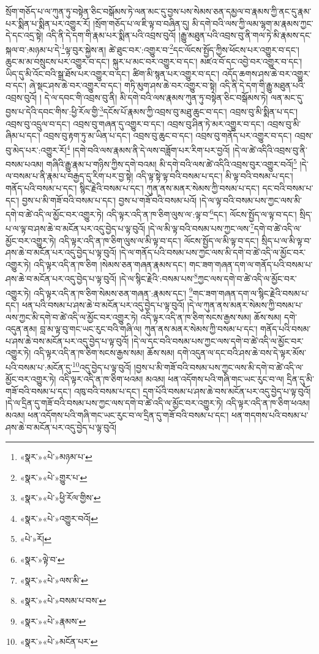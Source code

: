 སྲོག་གཅོད་པ་ལ་ཀུན་ཏུ་བསྟེན་ཅིང་བསྒོམས་ཏེ་ལན་མང་དུ་བྱས་པས་སེམས་ཅན་དམྱལ་བ་རྣམས་ཀྱི་ནང་དུ་རྣམ་པར་སྨིན་པ་སྨིན་པར་འགྱུར་རོ། །སྲོག་གཅོད་པ་ལ་ཇི་ལྟ་བ་བཞིན་དུ། མི་དགེ་བའི་ལས་ཀྱི་ལམ་ལྷག་མ་རྣམས་ཀྱང་དེ་དང་འདྲ་སྟེ། འདི་ནི་དེ་དག་གི་རྣམ་པར་སྨིན་པའི་འབྲས་བུའོ། །རྒྱུ་མཐུན་པའི་འབྲས་བུ་ནི་གལ་ཏེ་མི་རྣམས་དང་སྐལ་བ་:མཉམ་པ་དེ་\footnote{«སྣར་»«པེ་»མཉམ་པ་}ལྟ་བུར་སྐྱེས་ན། ཚེ་ཐུང་བར་:འགྱུར་བ་\footnote{«སྣར་»«པེ་»གྱུར་པ་}དང་ལོངས་སྤྱོད་ཀྱིས་ཕོངས་པར་འགྱུར་བ་དང་། ཆུང་མ་མ་བསྲུངས་པར་འགྱུར་བ་དང་། སྐུར་པ་མང་བར་འགྱུར་བ་དང་། མཛའ་བོ་དང་འབྱེ་བར་འགྱུར་བ་དང་། ཡིད་དུ་མི་འོང་བའི་སྒྲ་ཐོས་པར་འགྱུར་བ་དང་། ཚིག་མི་སྙན་པར་འགྱུར་བ་དང་། འདོད་ཆགས་ཤས་ཆེ་བར་འགྱུར་བ་དང་། ཞེ་སྡང་ཤས་ཆེ་བར་འགྱུར་བ་དང་། གཏི་མུག་ཤས་ཆེ་བར་འགྱུར་བ་སྟེ། འདི་ནི་དེ་དག་གི་རྒྱུ་མཐུན་པའི་འབྲས་བུའོ། །
དེ་ལ་དབང་གི་འབྲས་བུ་ནི། མི་དགེ་བའི་ལས་རྣམས་ཀུན་ཏུ་བསྟེན་ཅིང་བསྒོམས་ཏེ། ལན་མང་དུ་བྱས་པ་དེའི་དབང་གིས་:ཕྱི་རོལ་གྱི་\footnote{«སྣར་»«པེ་»ཕྱི་རོལ་གྱིས་}དངོས་པོ་རྣམས་ཀྱི་འབྲས་བུ་མཐུ་ཆུང་བ་དང་། འབྲས་བུ་མི་སྨིན་པ་དང་། འབྲས་བུ་འདྲུལ་བ་དང་། འབྲས་བུ་གཞན་དུ་འགྱུར་བ་དང་། འབྲས་བུ་ཤིན་ཏེ་མར་འགྱུར་བ་དང་། འབྲས་བུ་མི་ཞིམ་པ་དང་། འབྲས་བུ་རྟག་ཏུ་མ་ཡིན་པ་དང་། འབྲས་བུ་ཆུང་བ་དང་། འབྲས་བུ་གནོད་པར་འགྱུར་བ་དང་། འབྲས་བུ་མེད་པར་:འགྱུར་རོ།\footnote{«སྣར་»«པེ་»འགྱུར་བའོ།} །དགེ་བའི་ལས་རྣམས་ནི་དེ་ལས་བཟློག་པར་རིག་པར་བྱའོ། །དེ་ལ་ཚེ་འདིའི་འབྲས་བུ་ནི་བསམ་པའམ། གཞིའི་རྒྱུ་རྣམ་པ་གཉིས་ཀྱིས་དགེ་བའམ། མི་དགེ་བའི་ལས་ཚེ་འདིའི་འབྲས་བུར་འགྱུར་བའོ།\footnote{«པེ་»རོ།} །དེ་ལ་བསམ་པ་ནི་རྣམ་པ་བརྒྱད་དུ་རིག་པར་བྱ་སྟེ། འདི་ལྟ་སྟེ་ལྟ་བའི་བསམ་པ་དང་། མི་ལྟ་བའི་བསམ་པ་དང་། གནོད་པའི་བསམ་པ་དང་། སྙིང་རྗེའི་བསམ་པ་དང་། ཀུན་ནས་མནར་སེམས་ཀྱི་བསམ་པ་དང་། དང་བའི་བསམ་པ་དང་། བྱས་པ་མི་གཟོ་བའི་བསམ་པ་དང་། བྱས་པ་གཟོ་བའི་བསམ་པའོ། །དེ་ལ་ལྟ་བའི་བསམ་པས་ཀྱང་ལས་མི་དགེ་བ་ཚེ་འདི་ལ་མྱོང་བར་འགྱུར་ཏེ། འདི་ལྟར་འདི་ན་ཁ་ཅིག་ལུས་ལ་:ལྟ་བ་\footnote{«སྣར་»ལྟེ་བ་}དང་། ལོངས་སྤྱོད་ལ་ལྟ་བ་དང་། སྲིད་པ་ལ་ལྟ་བ་ཤས་ཆེ་བ་མངོན་པར་འདུ་བྱེད་པ་ལྟ་བུའོ། །དེ་ལ་མི་ལྟ་བའི་བསམ་པས་ཀྱང་ལས་\footnote{«སྣར་»«པེ་»ལས་མི་}དགེ་བ་ཚེ་འདི་ལ་མྱོང་བར་འགྱུར་ཏེ། འདི་ལྟར་འདི་ན་ཁ་ཅིག་ལུས་ལ་མི་ལྟ་བ་དང་། ལོངས་སྤྱོད་ལ་མི་ལྟ་བ་དང་། སྲིད་པ་ལ་མི་ལྟ་བ་ཤས་ཆེ་བ་མངོན་པར་འདུ་བྱེད་པ་ལྟ་བུའོ། །དེ་ལ་གནོད་པའི་བསམ་པས་ཀྱང་ལས་མི་དགེ་བ་ཚེ་འདི་ལ་མྱོང་བར་འགྱུར་ཏེ། འདི་ལྟར་འདི་ན་ཁ་ཅིག །སེམས་ཅན་གཞན་རྣམས་དང་། གང་ཟག་གཞན་དག་ལ་གནོད་པའི་བསམ་པ་ཤས་ཆེ་བ་མངོན་པར་འདུ་བྱེད་པ་ལྟ་བུའོ། །དེ་ལ་སྙིང་རྗེའི་:བསམ་པས་\footnote{«སྣར་»«པེ་»བསམ་པ་བས་}ཀྱང་ལས་དགེ་བ་ཚེ་འདི་ལ་མྱོང་བར་འགྱུར་ཏེ། འདི་ལྟར་འདི་ན་ཁ་ཅིག་སེམས་ཅན་གཞན་:རྣམས་དང་། \footnote{«སྣར་»«པེ་»རྣམས་}གང་ཟག་གཞན་དག་ལ་སྙིང་རྗེའི་བསམ་པ་དང་། ཕན་པའི་བསམ་པ་ཤས་ཆེ་བ་མངོན་པར་འདུ་བྱེད་པ་ལྟ་བུའོ། །དེ་ལ་ཀུན་ནས་མནར་སེམས་ཀྱི་བསམ་པ་ལས་ཀྱང་མི་དགེ་བ་ཚེ་འདི་ལ་མྱོང་བར་འགྱུར་ཏེ། འདི་ལྟར་འདི་ན་ཁ་ཅིག་སངས་རྒྱས་སམ། ཆོས་སམ། དགེ་འདུན་ནམ། བླ་མ་ལྟ་བུ་གང་ཡང་རུང་བའི་གཞི་ལ། ཀུན་ནས་མནར་སེམས་ཀྱི་བསམ་པ་དང་། གནོད་པའི་བསམ་པ་ཤས་ཆེ་བས་མངོན་པར་འདུ་བྱེད་པ་ལྟ་བུའོ། །དེ་ལ་དང་བའི་བསམ་པས་ཀྱང་ལས་དགེ་བ་ཚེ་འདི་ལ་མྱོང་བར་འགྱུར་ཏེ། འདི་ལྟར་འདི་ན་ཁ་ཅིག་སངས་རྒྱས་སམ། ཆོས་སམ། དགེ་འདུན་ལ་དང་བའི་ཤས་ཆེ་བས་དེ་ལྟར་མོས་པའི་བསམ་པ་:མངོན་དུ་\footnote{«སྣར་»«པེ་»མངོན་པར་}འདུ་བྱེད་པ་ལྟ་བུའོ། །བྱས་པ་མི་གཟོ་བའི་བསམ་པས་ཀྱང་ལས་མི་དགེ་བ་ཚེ་འདི་ལ་མྱོང་བར་འགྱུར་ཏེ། འདི་ལྟར་འདི་ན་ཁ་ཅིག་ཕའམ། མའམ། ཕན་འདོགས་པའི་གཞི་གང་ཡང་རུང་བ་ལ། དྲིན་དུ་མི་གཟོ་བའི་བསམ་པ་དང་། འཁུ་བའི་བསམ་པ་དང་། དྲག་པོའི་བསམ་པ་ཤས་ཆེ་བས་མངོན་པར་འདུ་བྱེད་པ་ལྟ་བུའོ། །དེ་ལ་དྲིན་དུ་གཟོ་བའི་བསམ་པས་ཀྱང་ལས་དགེ་བ་ཚེ་འདི་ལ་མྱོང་བར་འགྱུར་ཏེ། འདི་ལྟར་འདི་ན་ཁ་ཅིག་ཕའམ། མའམ། ཕན་འདོགས་པའི་གཞི་གང་ཡང་རུང་བ་ལ་དྲིན་དུ་གཟོ་བའི་བསམ་པ་དང་། ཕན་གདགས་པའི་བསམ་པ་ཤས་ཆེ་བ་མངོན་པར་འདུ་བྱེད་པ་ལྟ་བུའོ། 